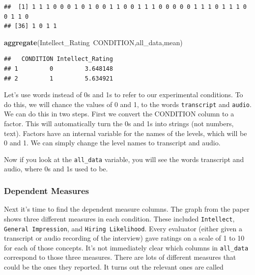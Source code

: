 \documentclass[]{book}
\newenvironment{Shaded}{\begin{snugshade}}{\end{snugshade}}
\newcommand{\KeywordTok}[1]{\textcolor[rgb]{0.13,0.29,0.53}{\textbf{{#1}}}}
\newcommand{\StringTok}[1]{\textcolor[rgb]{0.31,0.60,0.02}{{#1}}}
\newcommand{\NormalTok}[1]{{#1}}
\theoremstyle{definition}
\theoremstyle{definition}
\theoremstyle{definition}
\theoremstyle{remark}
\begin{document}
\begin{verbatim}
##  [1] 1 1 1 0 0 0 1 0 1 0 0 1 1 0 0 1 1 1 0 0 0 0 0 1 1 1 0 1 1 1 0 0 1 1 0
## [36] 1 0 1 1
\end{verbatim}

\begin{Shaded}
\begin{Highlighting}[]
\KeywordTok{aggregate}\NormalTok{(Intellect_Rating~CONDITION,all_data,mean)}
\end{Highlighting}
\end{Shaded}

\begin{verbatim}
##   CONDITION Intellect_Rating
## 1         0         3.648148
## 2         1         5.634921
\end{verbatim}

Let's use words instead of 0s and 1s to refer to our experimental
conditions. To do this, we will chance the values of 0 and 1, to the
words \texttt{transcript} and \texttt{audio}. We can do this in two
steps. First we convert the CONDITION column to a factor. This will
automatically turn the 0s and 1s into strings (not numbers, text).
Factors have an internal variable for the names of the levels, which
will be 0 and 1. We can simply change the level names to transcript and
audio.

\begin{Shaded}
\end{Shaded}

Now if you look at the \texttt{all\_data} variable, you will see the
words transcript and audio, where 0s and 1s used to be.

\subsubsection{Dependent Measures}\label{dependent-measures}

Next it's time to find the dependent measure columns. The graph from the
paper shows three different measures in each condition. These included
\texttt{Intellect}, \texttt{General\ Impression}, and
\texttt{Hiring\ Likelihood}. Every evaluator (either given a transcript
or audio recording of the interview) gave ratings on a scale of 1 to 10
for each of those concepts. It's not immediately clear which columns in
\texttt{all\_data} correspond to those three measures. There are lots of
different measures that could be the ones they reported. It turns out
the relevant ones are called
\end{document}
